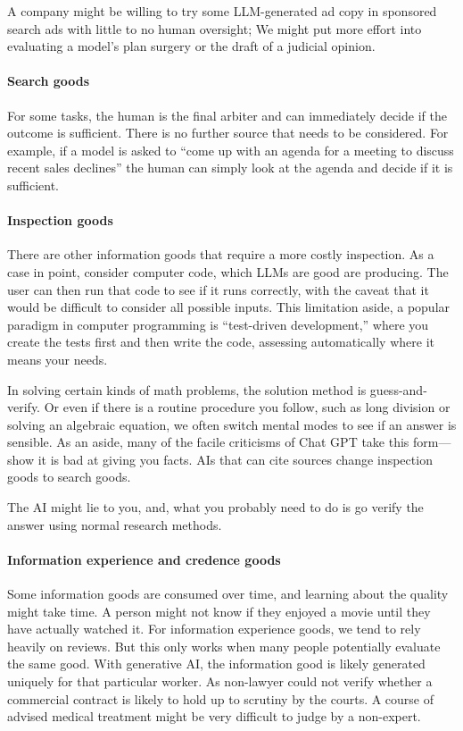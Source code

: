 \documentclass{article}
\begin{document}
A company might be willing to try some LLM-generated ad copy in sponsored search ads with little to no human oversight; 
We might put more effort into evaluating a model's plan surgery or the draft of a judicial opinion.

\paragraph{Search goods}
For some tasks, the human is the final arbiter and can immediately decide if the outcome is sufficient.
There is no further source that needs to be considered.
For example, if a model is asked to ``come up with an agenda for a meeting to discuss recent sales declines'' the human can simply look at the agenda and decide if it is sufficient. 

\paragraph{Inspection goods}
There are other information goods that require a more costly inspection. 
As a case in point, consider computer code, which LLMs are good are producing. 
The user can then run that code to see if it runs correctly, with the caveat that it would be difficult to consider all possible inputs. 
This limitation aside, a popular paradigm in computer programming is ``test-driven development,'' where you create the tests first and then write the code, assessing automatically where it means your needs.

In solving certain kinds of math problems, the solution method is guess-and-verify. 
Or even if there is a routine procedure you follow, such as long division or solving an algebraic equation, we often switch mental modes to see if an answer is sensible. 
As an aside, many of the facile criticisms of Chat GPT take this form---show it is bad at giving you facts.  
AIs that can cite sources change inspection goods to search goods. 

The AI might lie to you, and, what you probably need to do is go verify the answer using normal research methods.

\paragraph{Information experience and credence goods}
Some information goods are consumed over time, and learning about the quality might take time. 
A person might not know if they enjoyed a movie until they have actually watched it. 
For information experience goods, we tend to rely heavily on reviews. 
But this only works when many people potentially evaluate the same good. 
With generative AI, the information good is likely generated uniquely for that particular worker. 
As non-lawyer could not verify whether a commercial contract is likely to hold up to scrutiny by the courts. 
A course of advised medical treatment might be very difficult to judge by a non-expert.
\end{document}
